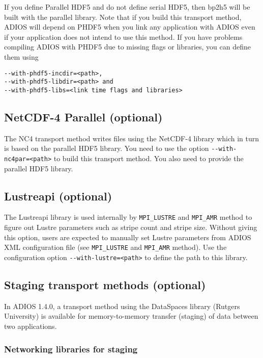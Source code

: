 If you define Parallel HDF5 and do not define serial HDF5, then bp2h5 will be built 
with the parallel library. 
Note that if you build this transport method, ADIOS will depend on PHDF5 when you 
link any application with ADIOS even if your application does not intend to 
use this method. 
If you have problems compiling ADIOS with PHDF5 due to missing flags or libraries, 
you can define them using 

\begin{lstlisting}
--with-phdf5-incdir=<path>,
--with-phdf5-libdir=<path> and 
--with-phdf5-libs=<link time flags and libraries>
\end{lstlisting}

\subsection{NetCDF-4 Parallel (optional)}

The NC4 transport method writes files using the NetCDF-4 library which in turn 
is based on the parallel HDF5 library. You need to use the option 
\verb+--with-nc4par=<path>+ to build this transport method. 
You also need to provide the parallel HDF5 library. 

\subsection{Lustreapi (optional)}

The Lustreapi library is used internally by \verb+MPI_LUSTRE+ and \verb+MPI_AMR+ method to 
figure out Lustre parameters such as stripe count and stripe size.  Without giving 
this option, users are expected to manually set Lustre parameters from ADIOS XML 
configuration file (see \verb+MPI_LUSTRE+ and \verb+MPI_AMR+ method). 
Use the configuration option
\verb+--with-lustre=<path>+ to define the path to this library.

\subsection{Staging transport methods (optional)}

In ADIOS 1.4.0, a transport method using the DataSpaces library (Rutgers University) 
is available for memory-to-memory transfer (staging) of data between two 
applications. 

\subsubsection{Networking libraries for staging}

